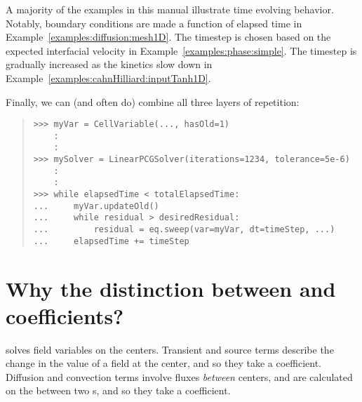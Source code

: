 \begin{description}
        A majority of the examples in this manual illustrate time
        evolving behavior. Notably, boundary conditions are made a
        function of elapsed time in
        Example~\ref{examples:diffusion:mesh1D}. The timestep is
        chosen based on the expected interfacial velocity in
        Example~\ref{examples:phase:simple}. The timestep is
        gradually increased as the kinetics slow down in
        Example~\ref{examples:cahnHilliard:inputTanh1D}.
    
    \end{description}
    
    Finally, we can (and often do) combine all three layers of repetition:
    \begin{quote}
\begin{verbatim}
>>> myVar = CellVariable(..., hasOld=1)
    : 
    :
>>> mySolver = LinearPCGSolver(iterations=1234, tolerance=5e-6) 
    : 
    :
>>> while elapsedTime < totalElapsedTime:
...     myVar.updateOld()
...     while residual > desiredResidual:
...         residual = eq.sweep(var=myVar, dt=timeStep, ...)
...     elapsedTime += timeStep
\end{verbatim}
    \end{quote}

    \section{Why the distinction between  and
     coefficients?}  \FiPy{} solves field
    variables on the  centers.  Transient and source terms
    describe the change in the value of a field at the 
    center, and so they take a  coefficient.
    Diffusion and convection terms involve fluxes \emph{between}
     centers, and are calculated on the 
    between two s, and so they take a 
    coefficient.
    
